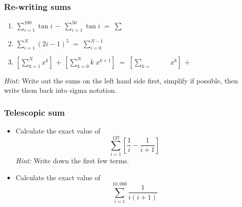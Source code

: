 \documentclass[14pt]{beamer}
\begin{document}
\begin{frame}[t]
	\fontsize{13}{13}\selectfont
	\frametitle{Re-writing sums}

	\begin{enumerate}
		\item $\displaystyle \sum_{i=1}^{100}\tan i \, - \, \sum_{i=1}^{50}\tan i \;
			= \; \sum_{\boxed{\phantom{???}}}^{\boxed{\phantom{???}}}\boxed{\phantom{?????^f_p}}$
			\vfill

		\item $\displaystyle \sum_{i=1}^{N}(2i-1)^{5}\; = \; \sum_{i=0}^{N-1}\boxed{\phantom{?????^f_p}}$
			\vfill

		\item $\displaystyle \left[ \sum_{k=1}^{N}x^{k}\right] \, + \, \left[ \sum_{k=0}
			^{N}k \; x^{k+1}\right] \; = \; \left[ \sum_{k=\boxed{\phantom{???}}}^{\boxed{\phantom{???}}}
			\!\!\boxed{\phantom{???}}\,x^{k}\right] \, + \, \boxed{\phantom{???}}$
			\vfill
	\end{enumerate}

	\emph{Hint:} Write out the sums on the left hand side first, simplify if
	possible, then write them back into sigma notation.
\end{frame}

\begin{frame}[t]
	\frametitle{Telescopic sum}

	\begin{itemize}
		\item Calculate the exact value of
			\[
				\sum_{i=1}^{137}\left[ \frac{1}{i}- \frac{1}{i+1}\right]
			\]
			\emph{Hint:} Write down the first few terms.


		\item Calculate the exact value of
			\[
				\sum_{i=1}^{10,000}\frac{1}{i(i+1)}
			\]
	\end{itemize}
\end{frame}
\end{document}
